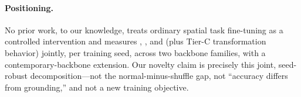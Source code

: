 \paragraph{Positioning.}
No prior work, to our knowledge, treats ordinary spatial task fine-tuning
as a controlled intervention and measures \dA{}, \dG{}, and \dC{} (plus
Tier-C transformation behavior) jointly, per training seed, across two
backbone families, with a contemporary-backbone extension. Our novelty
claim is precisely this joint, seed-robust decomposition---not the
normal-minus-shuffle gap, not ``accuracy differs from grounding,'' and not
a new training objective.
